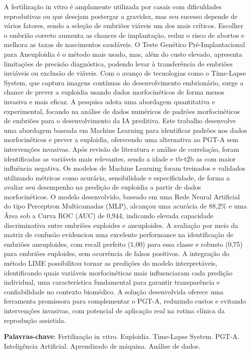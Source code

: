 \begin{resumo}
A fertilização in vitro é amplamente utilizada por casais com dificuldades reprodutivas ou que desejam postergar a gravidez, mas seu sucesso depende de vários fatores, sendo a seleção de embriões viáveis um dos mais críticos. Escolher o embrião correto aumenta as chances de implantação, reduz o risco de abortos e melhora as taxas de nascimentos saudáveis. O Teste Genético Pré-Implantacional para Aneuploidia é o método mais usado, mas, além do custo elevado, apresenta limitações de precisão diagnóstica, podendo levar à transferência de embriões inviáveis ou exclusão de viáveis. Com o avanço de tecnologias como o Time-Lapse System, que captura imagens contínuas do desenvolvimento embrionário, surge a chance de prever a euploidia usando dados morfocinéticos de forma menos invasiva e mais eficaz. A pesquisa adota uma abordagem quantitativa e experimental, focando na análise de dados numéricos de padrões morfocinéticos de embriões para o desenvolvimento da IA preditiva. Este trabalho desenvolve uma abordagem baseada em Machine Learning para identificar padrões nos dados morfocinéticos e prever a euploidia, oferecendo uma alternativa ao PGT-A sem intervenções invasivas. Após revisão de literatura e análise de correlação, foram identificadas as variáveis mais relevantes, sendo a idade e tb-t2b as com maior influência negativa. Os modelos de Machine Learning foram treinados e validados utilizando métricas como acurácia, sensibilidade e especificidade, de forma a avaliar seu desempenho na predição de euploidia a partir de dados morfocinéticos. O modelo desenvolvido, baseado em uma Rede Neural Artificial do tipo Perceptron Multicamadas (MLP), alcançou uma acurácia de 88,2\% e uma Área sob a Curva ROC (AUC) de 0,944, indicando elevada capacidade discriminativa entre embriões euploides e aneuploides. A avaliação por meio da matriz de confusão evidenciou uma excelente performance na identificação de embriões aneuploides, com recall perfeito (1,00) para essa classe e robusto (0,75) para embriões euploides, sem ocorrência de falsos positivos. A integração do método LIME possibilitou tornar as predições do modelo interpretáveis, identificando quais variáveis morfocinéticas mais influenciaram cada predição individual, uma característica fundamental para garantir transparência e confiabilidade no contexto biomédico. A solução desenvolvida oferece uma ferramenta promissora para complementar o PGT-A, reduzindo custos e evitando intervenções invasivas, com potencial de aplicação real na rotina clínica da reprodução assistida.

\vspace{\onelineskip}
    
\noindent
\textbf{Palavras-chave}: Fertilização in vitro. Euploidia. Time-Lapse System. PGT-A. Inteligência Artificial. Aprendizado de máquina. Análise de dados.

\end{resumo}
